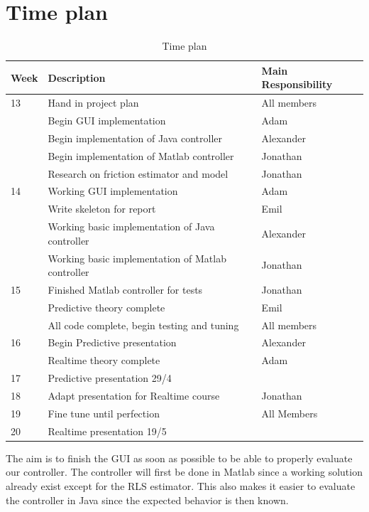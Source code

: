 \documentclass[10pt,a4paper]{article}
\begin{document}
\section{Time plan}
\begin{table}[H]
\centering
\caption{Time plan}
\label{hoho}
\begin{tabular}{|l|l|l|}
\hline
Week & Description & Main Responsibility \\ \hline
13 & Hand in project plan & All members \\ \hline
& Begin GUI implementation & Adam \\ \hline
& Begin implementation of Java controller & Alexander \\ \hline
& Begin implementation of Matlab controller & Jonathan \\ \hline
& Research on friction estimator and model & Jonathan \\ \hline
14 & Working GUI implementation & Adam \\ \hline
& Write skeleton for report & Emil \\ \hline
& Working basic implementation of Java controller & Alexander \\ \hline
& Working basic implementation of Matlab controller & Jonathan \\ \hline
15 & Finished Matlab controller for tests & Jonathan \\ \hline
& Predictive theory complete  & Emil \\ \hline
& All code complete, begin testing and tuning & All members \\ \hline
16 & Begin Predictive presentation & Alexander \\ \hline
& Realtime theory complete & Adam \\ \hline
17 & Predictive presentation 29/4 & \\ \hline
18 & Adapt presentation for Realtime course & Jonathan \\ \hline
19 & Fine tune until perfection & All Members \\ \hline
20 & Realtime presentation 19/5  & \\ \hline
\end{tabular}
\end{table}
The aim is to finish the GUI as soon as possible to be able to properly evaluate our controller. The controller will first be done in Matlab since a working solution already exist except for the RLS estimator. This also makes it easier to evaluate the controller in Java since the expected behavior is then known.
\end{document}
